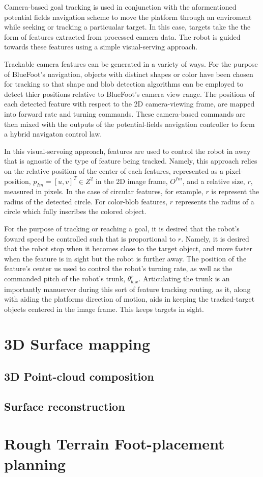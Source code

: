 		Camera-based goal tracking is used in conjunction with the aformentioned potential fields navigation scheme to move the platform through an enviroment while seeking or tracking a particualar target. In this case, targets take the the form of features extracted from processed camera data. The robot is guided towards these features using a simple visual-serving approach. 

Trackable camera features can be generated in a variety of ways. For the purpose of BlueFoot's navigation, objects with distinct shapes or color have been chosen for tracking so that shape and blob detection algorithms can be employed to detect thier positions relative to BlueFoot's camera view range. The positions of each detected feature with respect to the 2D camera-viewing frame, are mapped into forward rate and turning commands. These camera-based commands are then mixed with the outputs of the potential-fields navigation controller to form a hybrid navigaton control law.

In this visual-servoing approach, features are used to control the robot in away that is agnostic of the type of feature being tracked. Namely, this approach relies on the relative position of the center of each features, represented as a pixel-position, $p_{Im} = [u,v]^{T} \in Z^{2}$ in the 2D image frame, $O^{Im}$, and a relative size, $r$, measured in pixels. In the case of circular features, for example, $r$ is represent the radius of the detected circle. For color-blob features, $r$ represents the radius of a circle which fully inscribes the colored object. 

For the purpose of tracking or reaching a goal, it is desired that the robot's foward speed be controlled such that is proportional to $r$. Namely, it is desired that the robot stop when it becomes close to the target object, and move faster when the feature is in sight but the robot is further away. The position of the feature's center us used to control the robot's turning rate, as well as the commanded pitch of the robot's trunk, $\theta_{b,x}^{r}$. Articulating the trunk is an importantly manuerver during this sort of feature tracking routing, as it, along with aiding the platforms direction of motion, aids in keeping the tracked-target objects centered in the image frame. This keeps targets in sight.
	\section{3D Surface mapping}


		\subsection{3D Point-cloud composition}


		\subsection{Surface reconstruction}



	\section{Rough Terrain Foot-placement planning}


